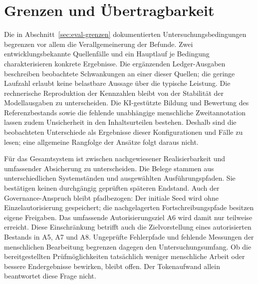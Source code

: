 
\section{Grenzen und Übertragbarkeit}
\label{sec:diskussion-grenzen-uebertragbarkeit}

Die in Abschnitt~\ref{sec:eval-grenzen} dokumentierten
Untersuchungsbedingungen begrenzen vor allem die Verallgemeinerung der
Befunde. Zwei entwicklungsbekannte Quellenfälle und ein Hauptlauf je
Bedingung charakterisieren konkrete Ergebnisse. Die ergänzenden
Ledger-Ausgaben beschreiben beobachtete Schwankungen an einer dieser
Quellen; die geringe Laufzahl erlaubt keine belastbare Aussage über
die typische Leistung. Die rechnerische Reproduktion der Kennzahlen
bleibt von der Stabilität der Modellausgaben zu unterscheiden. Die KI-gestützte Bildung und
Bewertung des Referenzbestands sowie die fehlende unabhängige
menschliche Zweitannotation lassen zudem Unsicherheit in den
Inhaltsurteilen bestehen. Deshalb sind
die beobachteten Unterschiede als Ergebnisse dieser Konfigurationen und
Fälle zu lesen; eine allgemeine Rangfolge der Ansätze folgt daraus nicht.

Für das Gesamtsystem ist zwischen nachgewiesener Realisierbarkeit und
umfassender Absicherung zu unterscheiden. Die Belege stammen aus
unterschiedlichen Systemständen und ausgewählten Ausführungspfaden.
Sie bestätigen keinen durchgängig geprüften späteren Endstand. Auch
der Governance-Anspruch bleibt pfadbezogen: Der initiale Seed wird ohne
Einzelautorisierung gespeichert; die nachgelagerten
Fortschreibungspfade besitzen eigene Freigaben. Das umfassende Autorisierungsziel A6 wird damit nur teilweise
erreicht. Diese Einschränkung betrifft auch die Zielvorstellung
eines autorisierten Bestands in A5, A7 und A8. Ungeprüfte Fehlerpfade und fehlende
Messungen der menschlichen Bearbeitung begrenzen dagegen den
Untersuchungsumfang. Ob die bereitgestellten Prüfmöglichkeiten tatsächlich
weniger menschliche Arbeit oder bessere Endergebnisse bewirken, bleibt
offen. Der Tokenaufwand allein beantwortet diese Frage nicht.

